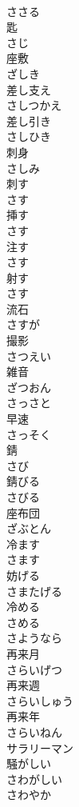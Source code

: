 \documentclass[8pt]{extreport}
\begin{document}
\begin{CJK}{UTF8}{min}
\\	ささる	
\\	匙 
\\	さじ	
\\	座敷 
\\	ざしき	
\\	差し支え 
\\	さしつかえ	
\\	差し引き 
\\	さしひき	
\\	刺身 
\\	さしみ	
\\	刺す 
\\	さす	
\\	挿す 
\\	さす	
\\	注す 
\\	さす	
\\	射す 
\\	さす	
\\	流石 
\\	さすが	
\\	撮影 
\\	さつえい	
\\	雑音 
\\	ざつおん	
\\	さっさと	
\\	早速 
\\	さっそく	
\\	錆 
\\	さび	
\\	錆びる 
\\	さびる	
\\	座布団 
\\	ざぶとん	
\\	冷ます 
\\	さます	
\\	妨げる 
\\	さまたげる	
\\	冷める 
\\	さめる	
\\	さようなら	
\\	再来月 
\\	さらいげつ	
\\	再来週 
\\	さらいしゅう	
\\	再来年 
\\	さらいねん	
\\	サラリーマン	
\\	騒がしい 
\\	さわがしい	
\\	さわやか	

\end{CJK}
\end{document}
